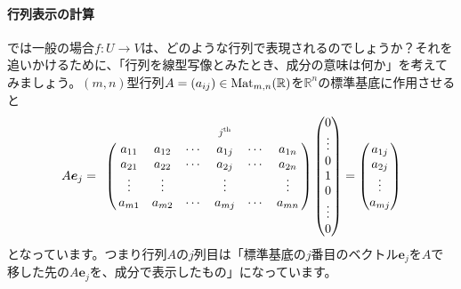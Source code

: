 \paragraph{行列表示の計算}

では一般の場合$f\colon U\rightarrow V$は、どのような行列で表現されるのでしょうか？それを追いかけるために、「行列を線型写像とみたとき、成分の意味は何か」を考えてみましょう。$(m, n)$型行列$A = (a_{ij}) \in \operatorname{Mat}_{m, n}(\mathbb{R})$を$\mathbb{R}^n$の標準基底に作用させると
\[
A\bm{e}_j = 
\bordermatrix{
& & & & \scalebox{0.8}{$j^{\text{th}}$} \cr
& a_{11} & a_{12} & \cdots & a_{1j} & \cdots & a_{1n} \cr
& a_{21} & a_{22} & \cdots & a_{2j} & \cdots & a_{2n} \cr
& \vdots & \vdots & & \vdots & & \vdots \cr
& a_{m1} & a_{m2} & \cdots & a_{mj} & \cdots & a_{mn}
}
\begin{pmatrix}
0 \\
\vdots \\
0 \\
1 \\
0 \\
\vdots \\
0
\end{pmatrix}
=
\begin{pmatrix}
a_{1j} \\
a_{2j} \\
\vdots \\
a_{mj}
\end{pmatrix}
\]
となっています。つまり行列$A$の$j$列目は「標準基底の$j$番目のベクトル$\bm{e}_j$を$A$で移した先の$A\bm{e}_j$を、成分で表示したもの」になっています。

